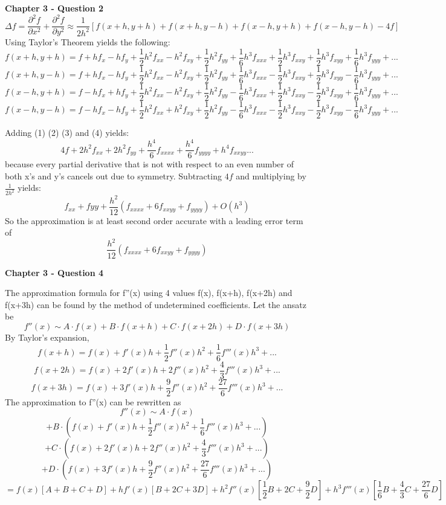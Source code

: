 \documentclass{article}
\begin{document}
\textbf{Chapter 3 - Question 2}
\[
\Delta f = \frac{\partial^{2} f}{\partial x^{2}} + \frac{\partial^{2} f}{\partial y^{2}} \approx \frac{1}{2h^2}[f(x+h,y+h) + f(x+h,y-h) + f(x-h, y+h) + f(x-h,y-h) - 4f]
\]
Using Taylor's Theorem yields the following:
\begin{equation}
 f(x+h,y+h) = f + hf_{x} - hf_{y} + \frac{1}{2}h^{2}f_{xx} - h^{2}f_{xy} + \frac{1}{2}h^{2}f_{yy} + \frac{1}{6}h^{3}f_{xxx} + \frac{1}{2}h^{3}f_{xxy} + \frac{1}{2}h^{3}f_{xyy} + \frac{1}{6}h^{3}f_{yyy} + ...
\end{equation}
\begin{equation}
f(x+h,y-h) = f + hf_{x} - hf_{y} + \frac{1}{2}h^{2}f_{xx} - h^{2}f_{xy} + \frac{1}{2}h^{2}f_{yy} + \frac{1}{6}h^{3}f_{xxx} - \frac{1}{2}h^{3}f_{xxy} + \frac{1}{2}h^{3}f_{xyy} - \frac{1}{6}h^{3}f_{yyy} + ...
\end{equation}
\begin{equation}
 f(x-h,y+h) = f - hf_{x} + hf_{y} + \frac{1}{2}h^{2}f_{xx} - h^{2}f_{xy} + \frac{1}{2}h^{2}f_{yy} - \frac{1}{6}h^{3}f_{xxx} + \frac{1}{2}h^{3}f_{xxy} - \frac{1}{2}h^{3}f_{xyy} + \frac{1}{6}h^{3}f_{yyy} + ...
\end{equation}
\begin{equation}
f(x-h,y-h) = f - hf_{x} - hf_{y} + \frac{1}{2}h^{2}f_{xx} + h^{2}f_{xy} + \frac{1}{2}h^{2}f_{yy} - \frac{1}{6}h^{3}f_{xxx} - \frac{1}{2}h^{3}f_{xxy} - \frac{1}{2}h^{3}f_{xyy} - \frac{1}{6}h^{3}f_{yyy} + ...
\end{equation}

Adding (1)  (2) (3) and (4) yields:
\[
4f + 2h^{2}f_{xx} + 2h^{2}f_{yy} + \frac{h^{4}}{6}f_{xxxx} + \frac{h^{4}}{6}f_{yyyy} +{h^{4}}f_{xxyy}...
\]
because every partial derivative that is not with respect to an even number of both x's and y's cancels out due to symmetry. Subtracting $4f$ and multiplying by $\frac{1}{2h^{2}}$ yields:
\[
f_{xx} + f{yy} + \frac{h^{2}}{12}(f_{xxxx} + 6f_{xxyy} + f_{yyyy} ) + O(h^{3})
\]
So the approximation is at least second order accurate with a leading error term of 
\[
\frac{h^{2}}{12}(f_{xxxx} + 6f_{xxyy} + f_{yyyy} )
\]


\textbf{Chapter 3 - Question 4}

The approximation formula for f''(x) using 4 values f(x), f(x+h), f(x+2h) and f(x+3h) can be found by the method of undetermined coefficients. Let the ansatz be 
\[
f''(x) \sim A\cdot f(x)+B\cdot f(x+h) + C \cdot f(x+2h) + D \cdot f(x+3h)
\]
By Taylor's expansion,  
\[
f(x+h) = f(x) + f'(x)h + \frac{1}{2}f''(x)h^{2}+\frac{1}{6}f'''(x)h^{3}+...
\]
\[
f(x+2h) =f(x)+2f'(x)h+2f''(x)h^{2}+\frac{4}{3}f'''(x)h^{3}+...
\]
\[
f(x+3h) =f(x)+3f'(x)h+\frac{9}{2}f''(x)h^{2}+\frac{27}{6}f'''(x)h^{3}+...
\]
The approximation to f''(x) can be rewritten as 
\[
f''(x) \sim A\cdot f(x) 
\]
\[
+ B \cdot (f(x) + f'(x)h + \frac{1}{2}f''(x)h^{2}+\frac{1}{6}f'''(x)h^{3}+...)
\]
\[
+ C\cdot (f(x)+2f'(x)h+2f''(x)h^{2}+\frac{4}{3}f'''(x)h^{3}+...)
\]
\[
+D \cdot (f(x)+3f'(x)h+\frac{9}{2}f''(x)h^{2}+\frac{27}{6}f'''(x)h^{3}+...)
\]
\[
= f(x)[A+B+C+D] + hf'(x)[B+2C+3D]+h^{2}f''(x)[\frac{1}{2}B+2C+\frac{9}{2}D]+h^{3}f'''(x)[\frac{1}{6}B+\frac{4}{3}C+\frac{27}{6}D]
\]
\end{document}
